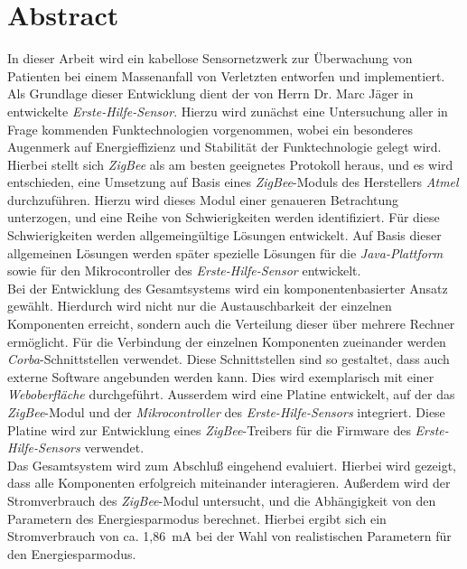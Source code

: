 \chapter*{Abstract}
\begin{small}
In dieser Arbeit wird ein kabellose Sensornetzwerk zur Überwachung von Patienten bei einem 
Massenanfall von Verletzten entworfen und implementiert. Als Grundlage dieser Entwicklung
dient der von Herrn Dr. Marc Jäger in \cite{Marc} entwickelte \emph{Erste-Hilfe-Sensor}.
Hierzu wird zunächst eine Untersuchung aller in Frage kommenden Funktechnologien vorgenommen,
wobei ein besonderes Augenmerk auf Energieffizienz und Stabilität der Funktechnologie gelegt wird.
Hierbei stellt sich \emph{ZigBee} als am besten geeignetes Protokoll heraus, und es wird entschieden,
eine Umsetzung auf Basis eines \emph{ZigBee}-Moduls des Herstellers \emph{Atmel} durchzuführen. Hierzu
wird dieses Modul einer genaueren Betrachtung unterzogen, und eine Reihe von Schwierigkeiten werden
identifiziert. Für diese Schwierigkeiten werden allgemeingültige Lösungen entwickelt. Auf Basis dieser
allgemeinen Lösungen werden später spezielle Lösungen für die \emph{Java-Plattform} sowie für den
Mikrocontroller des \emph{Erste-Hilfe-Sensor} entwickelt.
\\                    
Bei der Entwicklung des Gesamtsystems wird ein komponentenbasierter Ansatz gewählt. Hierdurch wird nicht
nur die Austauschbarkeit der einzelnen Komponenten erreicht, sondern auch die Verteilung dieser über
mehrere Rechner ermöglicht. Für die Verbindung der einzelnen Komponenten zueinander werden 
\emph{Corba}-Schnittstellen verwendet. Diese Schnittstellen sind so gestaltet, dass auch externe
Software angebunden werden kann. Dies wird exemplarisch mit einer \emph{Weboberfläche} durchgeführt.
Ausserdem wird eine Platine entwickelt, auf der das \emph{ZigBee}-Modul und der
\emph{Mikrocontroller} des \emph{Erste-Hilfe-Sensors} integriert. Diese Platine wird zur 
Entwicklung eines \emph{ZigBee}-Treibers für die Firmware des \emph{Erste-Hilfe-Sensors} verwendet.
\\
Das Gesamtsystem wird zum Abschluß eingehend evaluiert. Hierbei wird gezeigt, dass alle Komponenten
erfolgreich miteinander interagieren. Außerdem wird der Stromverbrauch des \emph{ZigBee}-Modul 
untersucht, und die Abhängigkeit von den Parametern des Energiesparmodus berechnet. Hierbei ergibt 
sich ein Stromverbrauch von ca. 1,86~mA bei der Wahl von realistischen Parametern für den 
Energiesparmodus.

\end{small}
